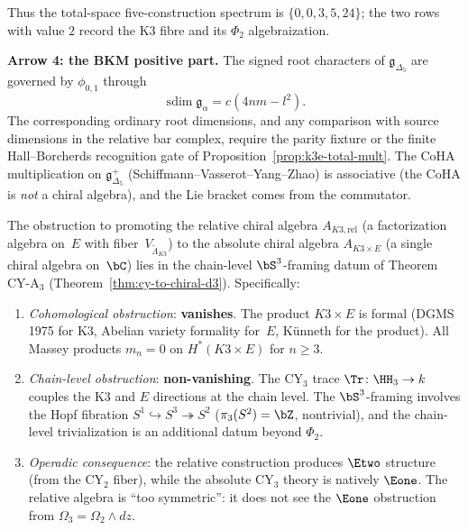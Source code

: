 Thus the total-space five-construction spectrum is
\(\{0,0,3,5,24\}\); the two rows with value \(2\) record the K3 fibre
and its \(\Phi_2\) algebraization.

\medskip
\noindent\textbf{Arrow 4: the BKM positive part.}
The signed root characters of $\mathfrak{g}_{\Delta_5}$ are governed
by $\phi_{0,1}$ through
\[
 \operatorname{sdim}\mathfrak g_\alpha=c(4nm-l^2).
\]
The corresponding ordinary root dimensions, and any comparison with
source dimensions in the relative bar complex, require the parity
fixture or the finite Hall--Borcherds recognition gate of
Proposition~\ref{prop:k3e-total-mult}.
The CoHA multiplication on $\mathfrak{g}_{\Delta_5}^+$
(Schiffmann--Vasserot--Yang--Zhao) is associative (the CoHA
is \emph{not} a chiral algebra), and the Lie bracket comes from the
commutator.

\begin{proposition}
\label{prop:k3e-relative-obstruction-standalone}
The obstruction to promoting the relative chiral algebra
$A_{K3,\mathrm{rel}}$ (a factorization algebra on~$E$ with
fiber~$V_{\widetilde{\Lambda}_{K3}}$) to the absolute chiral algebra
$A_{K3 \times E}$ (a single chiral algebra on~$\bC$) lies in the
chain-level $\bS^3$-framing datum of Theorem CY-A$_3$ (Theorem~\ref{thm:cy-to-chiral-d3}).
Specifically:
\begin{enumerate}[label=\textup{(\roman*)}]
 \item \emph{Cohomological obstruction}: \textbf{vanishes}.
 The product $K3 \times E$ is formal (DGMS 1975 for K3, Abelian
 variety formality for~$E$, K\"unneth for the product). All Massey
 products $m_n = 0$ on $H^*(K3 \times E)$ for $n \geq 3$.
 \item \emph{Chain-level obstruction}: \textbf{non-vanishing}.
 The CY$_3$ trace $\Tr \colon \HH_3 \to k$ couples the K3 and $E$
 directions at the chain level. The $\bS^3$-framing involves the
 Hopf fibration $S^1 \hookrightarrow S^3 \twoheadrightarrow S^2$
 ($\pi_3(S^2) = \bZ$, nontrivial), and the chain-level
 trivialization is an additional datum beyond $\Phi_2$.
 \item \emph{Operadic consequence}: the relative construction produces
 $\Etwo$ structure (from the CY$_2$ fiber), while the absolute
 CY$_3$ theory is natively $\Eone$. The relative algebra is
 ``too symmetric'': it does not see the $\Eone$ obstruction from
 $\Omega_3 = \Omega_2 \wedge dz$.
\end{enumerate}
\end{proposition}


